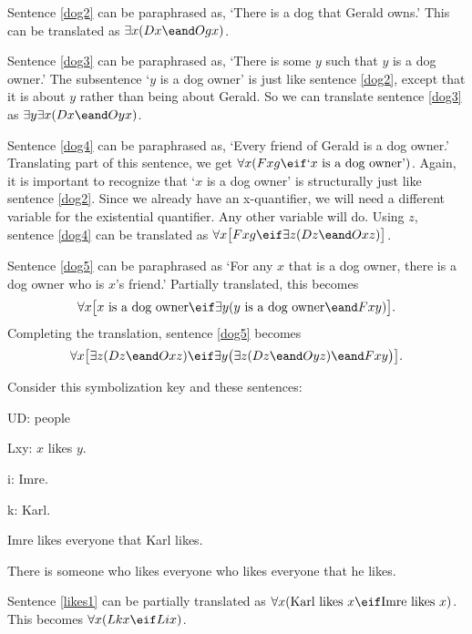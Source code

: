 Sentence \ref{dog2} can be paraphrased as, `There is a dog that Gerald owns.' This can be translated as $\exists x(Dx \eand Ogx)$.

Sentence \ref{dog3} can be paraphrased as, `There is some $y$ such that $y$ is a dog owner.' The subsentence `$y$ is a dog owner' is just like sentence \ref{dog2}, except that it is about $y$ rather than being about Gerald. So we can translate sentence \ref{dog3} as $\exists y \exists x(Dx \eand Oyx)$. 

Sentence \ref{dog4} can be paraphrased as, `Every friend of Gerald is a dog owner.' Translating part of this sentence, we get $\forall x(Fxg \eif\mbox{`$x$ is a dog owner'})$. Again, it is important to recognize that `$x$ is a dog owner' is structurally just like sentence \ref{dog2}. Since we already have an x-quantifier, we will need a different variable for the existential quantifier. Any other variable will do. Using $z$, sentence \ref{dog4} can be translated as $\forall x\bigl[Fxg \eif\exists z(Dz \eand Oxz)\bigr]$.

Sentence \ref{dog5} can be paraphrased as `For any $x$ that is a dog owner, there is a dog owner who is $x$'s friend.' Partially translated, this becomes $$\forall x\bigl[\mbox{$x$ is a dog owner}\eif\exists y(\mbox{$y$ is a dog owner}\eand Fxy)\bigr].$$ Completing the translation, sentence \ref{dog5} becomes $$\forall x\bigl[\exists z(Dz \eand Oxz)\eif\exists y\bigl(\exists z(Dz \eand Oyz)\eand Fxy\bigr)\bigr].$$

Consider this symbolization key and these sentences:
\begin{ekey}
\item[UD:] people
\item[Lxy:] $x$ likes $y$.
\item[i:] Imre.
\item[k:] Karl.
\end{ekey}
\begin{earg}
\item[\ex{likes1}]Imre likes everyone that Karl likes.
\item[\ex{likes2}]There is someone who likes everyone who likes everyone that he likes.
\end{earg}

Sentence \ref{likes1} can be partially translated as $\forall x(\mbox{Karl likes $x$}\eif\mbox{Imre likes $x$})$. This becomes $\forall x(Lkx\eif Lix)$.


